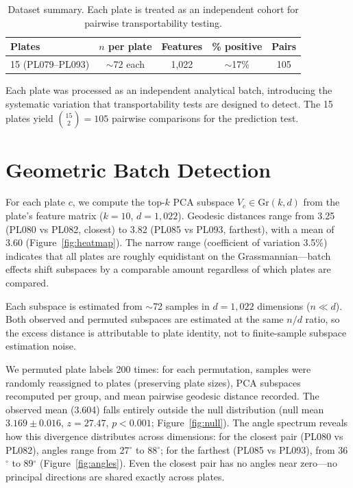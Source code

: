 \documentclass{article}
\begin{document}
\begin{table}[t]
\centering
\caption{Dataset summary. Each plate is treated as an independent cohort for pairwise transportability testing.}
\label{tab:cohorts}
\begin{tabular}{lcccc}
\toprule
Plates & $n$ per plate & Features & \% positive & Pairs \\
\midrule
15 (PL079--PL093) & $\sim$72 each & 1{,}022 & $\sim$17\% & 105 \\
\bottomrule
\end{tabular}
\end{table}

Each plate was processed as an independent analytical batch, introducing the systematic variation that transportability tests are designed to detect. The 15 plates yield $\binom{15}{2} = 105$ pairwise comparisons for the prediction test.


\section{Geometric Batch Detection}
\label{sec:batch}

For each plate $c$, we compute the top-$k$ PCA subspace $V_c \in \mathrm{Gr}(k, d)$ from the plate's feature matrix ($k = 10$, $d = 1{,}022$). Geodesic distances range from 3.25 (PL080 vs PL082, closest) to 3.82 (PL085 vs PL093, farthest), with a mean of 3.60 (Figure~\ref{fig:heatmap}). The narrow range (coefficient of variation 3.5\%) indicates that all plates are roughly equidistant on the Grassmannian---batch effects shift subspaces by a comparable amount regardless of which plates are compared.

Each subspace is estimated from $\sim$72 samples in $d = 1{,}022$ dimensions ($n \ll d$). Both observed and permuted subspaces are estimated at the same $n/d$ ratio, so the excess distance is attributable to plate identity, not to finite-sample subspace estimation noise.

We permuted plate labels 200 times: for each permutation, samples were randomly reassigned to plates (preserving plate sizes), PCA subspaces recomputed per group, and mean pairwise geodesic distance recorded. The observed mean (3.604) falls entirely outside the null distribution (null mean $3.169 \pm 0.016$, $z = 27.47$, $p < 0.001$; Figure~\ref{fig:null}). The angle spectrum reveals how this divergence distributes across dimensions: for the closest pair (PL080 vs PL082), angles range from 27$^\circ$ to 88$^\circ$; for the farthest (PL085 vs PL093), from 36$^\circ$ to 89$^\circ$ (Figure~\ref{fig:angles}). Even the closest pair has no angles near zero---no principal directions are shared exactly across plates.
\end{document}
